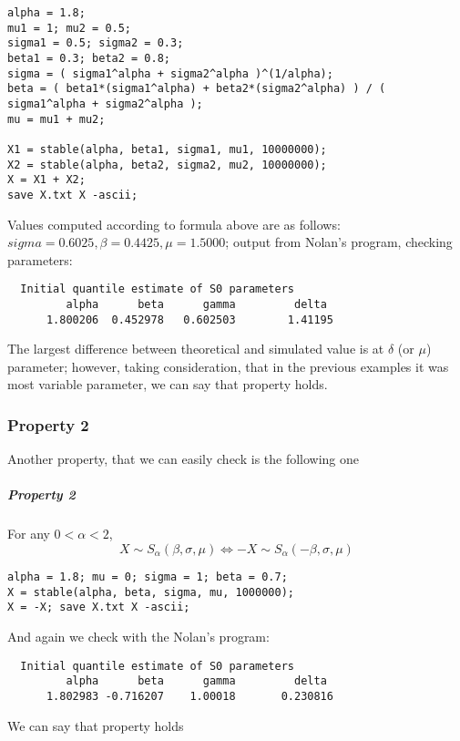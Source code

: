 \documentclass{article}
\begin{document}
\begin{lstlisting}
alpha = 1.8;
mu1 = 1; mu2 = 0.5;
sigma1 = 0.5; sigma2 = 0.3;
beta1 = 0.3; beta2 = 0.8;
sigma = ( sigma1^alpha + sigma2^alpha )^(1/alpha);
beta = ( beta1*(sigma1^alpha) + beta2*(sigma2^alpha) ) / ( sigma1^alpha + sigma2^alpha );
mu = mu1 + mu2;

X1 = stable(alpha, beta1, sigma1, mu1, 10000000);
X2 = stable(alpha, beta2, sigma2, mu2, 10000000);
X = X1 + X2;
save X.txt X -ascii;
\end{lstlisting}
Values computed according to formula above are as follows: $sigma = 0.6025, \beta = 0.4425, \mu = 1.5000$; output from Nolan's program, checking parameters:
\begin{lstlisting}
  Initial quantile estimate of S0 parameters
         alpha      beta      gamma         delta
      1.800206  0.452978   0.602503        1.41195 
\end{lstlisting}   
The largest difference between theoretical and simulated value is at $\delta$ (or $\mu$) parameter; however, taking consideration, that in the previous examples it was most variable parameter, we can say that property holds.

\subsubsection{Property 2}
Another property, that we can easily check is the following one
\subparagraph{Property 2}
For any $0 < \alpha < 2$,
\begin{equation}
X \sim S_\alpha(\beta, \sigma, \mu) \iff -X \sim S_\alpha(-\beta, \sigma, \mu)
\end{equation}

\begin{lstlisting}
alpha = 1.8; mu = 0; sigma = 1; beta = 0.7;
X = stable(alpha, beta, sigma, mu, 1000000);
X = -X; save X.txt X -ascii;
\end{lstlisting} 
And again we check with the Nolan's program:
\begin{lstlisting}
  Initial quantile estimate of S0 parameters
         alpha      beta      gamma         delta
      1.802983 -0.716207    1.00018       0.230816 
\end{lstlisting}
We can say that property holds
\end{document}
